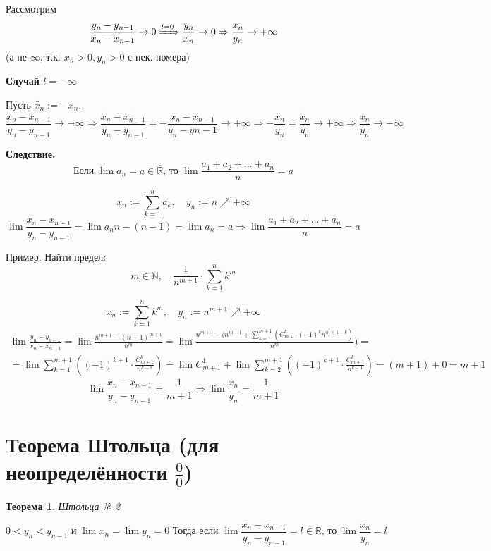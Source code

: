 \documentclass[12pt,letterpaper]{report}
\makeatletter
\newtheorem{theorem}{Теорема}
\renewenvironment{proof}[1][\proofname]{%
   \par\pushQED{\qed}\normalfont%
   \topsep6\p@\@plus6\p@\relax
   \trivlist\item[\hskip\labelsep\bfseries#1\@addpunct{.}]%
   \ignorespaces
}{%
   \popQED\endtrivlist\@endpefalse
}
\makeatother
\begin{document}
\begin{proof}
    Рассмотрим
    \[\frac{y_n - y_{n - 1}}{x_n - x_{n - 1}} \rightarrow 0
    \xRightarrow[]{l = 0} \frac{y_n}{x_n} \rightarrow 0 \Rightarrow
    \frac{x_n}{y_n} \rightarrow +\infty\] (а не $\infty$, т.к. 
    $x_n > 0, y_n > 0$ с нек. номера)

    \textbf{Случай $l = -\infty$}

    Пусть $\widetilde{x_n} := -x_n$.
    \[\frac{x_n - x_{n-1}}{y_n - y_{n - 1}} \rightarrow -\infty
    \Rightarrow \frac{\widetilde{x_n} - \widetilde{x_{n-1}}}
    {y_n - y_{n - 1}} = -\frac{x_n - x_{n-1}}{y_n - y{n - 1}}
    \rightarrow +\infty \Rightarrow -\frac{x_n}{y_n} =
    \frac{\widetilde{x_n}}{y_n} \rightarrow +\infty
    \Rightarrow \frac{x_n}{y_n} \rightarrow -\infty\] 

\end{proof}

\textbf{Следствие.}
\[\text{Если } \lim a_n = a \in \overline{\mathbb{R}}
\text{, то } \lim \frac{a_1 + a_2 + ... + a_n}{n} = a\] 
\begin{proof}
    \[x_n := \sum_{k=1}^n a_k, \quad y_n := n \nearrow +\infty\]
    \[\lim \frac{x_n - x_{n-1}}{y_n - y_{n-1}} = \lim{a_n}{n - (n - 1)}
    = \lim a_n = a \Rightarrow \lim \frac{a_1 + a_2 + ... + a_n}{n} = a\]
\end{proof}

Пример. Найти предел:
\[m \in \mathbb{N}, \quad \frac{1}{n^{m + 1}} \cdot \sum_{k=1}^{n} k^m\]

\[x_n := \sum_{k=1}^{n} k^m, \quad y_n := n^{m + 1} \nearrow +\infty\]
\begin{gather*}
    \lim \frac{y_n - y_{n - 1}}{x_n - x_{n - 1}} =
    \lim \frac{n^{m + 1} - (n - 1)^{m + 1}}{n^m} =
    \lim \frac{n^{m+1} - (n^{m+1} + \sum_{k = 1}^{m + 1} 
    (C_{m+1}^k (-1)^k n^{m+1-k})}{n^m}) = \\
    = \lim \sum_{k = 1}^{m + 1} 
    ((-1)^{k+1} \cdot \frac{C_{m+1}^k}{n^{k - 1}}) =
    \lim C_{m + 1}^1 + \lim \sum_{k = 2}^{m + 1} 
    ((-1)^{k+1} \cdot \frac{C_{m+1}^k}{n^{k - 1}}) =
    (m + 1) + 0 = m + 1
\end{gather*}
\[\lim\frac{x_n - x_{n - 1}}{y_n - y_{n-1}} = \frac1{m + 1}
\Rightarrow \lim\frac{x_n}{y_n} = \frac1{m + 1}\]

\section{Теорема Штольца (для неопределённости $\frac 0 0$)}

\begin{theorem}Штольца № 2\end{theorem}
\[0<y_n<y_{n-1} \text{ и } \lim x_n = \lim y_n = 0
\text{ Тогда если }\lim\frac{x_n - x_{n-1}}{y_n - y_{n-1}} = l \in
\overline{\mathbb{R}}\text{, то }\lim \frac{x_n}{y_n} = l\]
\end{document}
